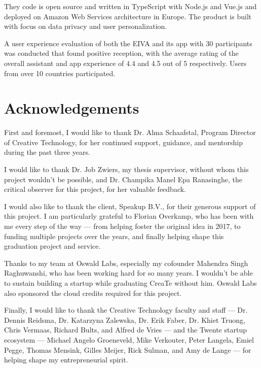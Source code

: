 \documentclass{article}
\begin{document}
They code is open source and written in TypeScript with Node.js and Vue.js and deployed on Amazon Web Services architecture in Europe. The product is built with focus on data privacy and user personalization.

A user experience evaluation of both the EIVA and its app with 30 participants was conducted that found positive reception, with the average rating of the overall assistant and app experience of 4.4 and 4.5 out of 5 respectively. Users from over 10 countries participated.

\newpage

\section*{Acknowledgements}

First and foremost, I would like to thank Dr. Alma Schaafstal, Program Director of Creative Technology, for her continued support, guidance, and mentorship during the past three years.

I would like to thank Dr. Job Zwiers, my thesis supervisor, without whom this project wouldn't be possible, and Dr. Champika Manel Epa Ranasinghe, the critical observer for this project, for her valuable feedback.

I would also like to thank the client, Speakup B.V., for their generous support of this project. I am particularly grateful to Florian Overkamp, who has been with me every step of the way --- from helping foster the original idea in 2017, to funding multiple projects over the years, and finally helping shape this graduation project and service.

Thanks to my team at Oswald Labs, especially my cofounder Mahendra Singh Raghuwanshi, who has been working hard for so many years. I wouldn't be able to sustain building a startup while graduating CreaTe without him. Oswald Labs also sponsored the cloud credits required for this project.

Finally, I would like to thank the Creative Technology faculty and staff --- Dr. Dennis Reidsma, Dr. Katarzyna Zalewska, Dr. Erik Faber, Dr. Khiet Truong, Chris Vermaas, Richard Bults, and Alfred de Vries --- and the Twente startup ecosystem --- Michael Angelo Groeneveld, Mike Verkouter, Peter Langela, Emiel Pegge, Thomas Mensink, Gilles Meijer, Rick Sulman, and Amy de Lange --- for helping shape my entrepreneurial spirit.

\newpage

\tableofcontents
\end{document}
